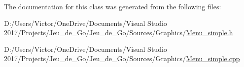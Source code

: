 The documentation for this class was generated from the following files\+:\begin{DoxyCompactItemize}
\item 
D\+:/\+Users/\+Victor/\+One\+Drive/\+Documents/\+Visual Studio 2017/\+Projects/\+Jeu\+\_\+de\+\_\+\+Go/\+Jeu\+\_\+de\+\_\+\+Go/\+Sources/\+Graphics/\hyperlink{_menu__simple_8h}{Menu\+\_\+simple.\+h}\item 
D\+:/\+Users/\+Victor/\+One\+Drive/\+Documents/\+Visual Studio 2017/\+Projects/\+Jeu\+\_\+de\+\_\+\+Go/\+Jeu\+\_\+de\+\_\+\+Go/\+Sources/\+Graphics/\hyperlink{_menu__simple_8cpp}{Menu\+\_\+simple.\+cpp}\end{DoxyCompactItemize}
